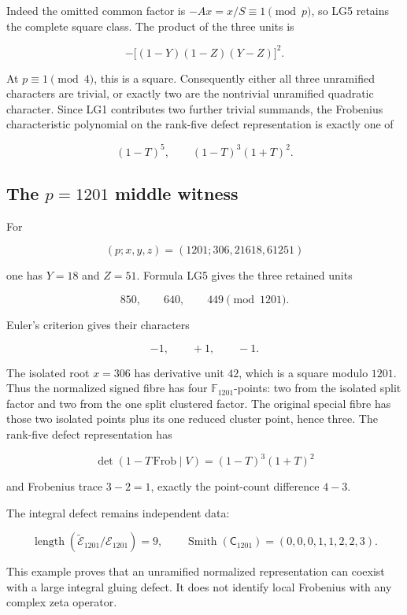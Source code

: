 Indeed the omitted common factor is \(-Ax=x/S\equiv1\pmod p\), so LG5
retains the complete square class. The product of the three units is

\[
-\bigl[(1-Y)(1-Z)(Y-Z)\bigr]^2.
\]

At \(p\equiv1\pmod4\), this is a square. Consequently either all three
unramified characters are trivial, or exactly two are the nontrivial
unramified quadratic character. Since LG1 contributes two further
trivial summands, the Frobenius characteristic polynomial on the
rank-five defect representation is exactly one of

\[
\boxed{(1-T)^5,\qquad (1-T)^3(1+T)^2.}
\tag{LG6}
\]

\subsection{\texorpdfstring{The \(p=1201\) middle
witness}{The p=1201 middle witness}}\label{the-p1201-middle-witness}

For

\[
(p;x,y,z)=(1201;306,21618,61251)
\]

one has \(Y=18\) and \(Z=51\). Formula LG5 gives the three retained
units

\[
850,\qquad640,\qquad449\pmod{1201}.
\]

Euler's criterion gives their characters

\[
-1,\qquad+1,\qquad-1.
\]

The isolated root \(x=306\) has derivative unit \(42\), which is a
square modulo \(1201\). Thus the normalized signed fibre has four
\(\mathbb F_{1201}\)-points: two from the isolated split factor and two
from the one split clustered factor. The original special fibre has
those two isolated points plus its one reduced cluster point, hence
three. The rank-five defect representation has

\[
\boxed{\det(1-T\,\mathrm{Frob}\mid V)=(1-T)^3(1+T)^2}
\]

and Frobenius trace \(3-2=1\), exactly the point-count difference
\(4-3\).

The integral defect remains independent data:

\[
\operatorname{length}
(\widetilde{\mathscr E}_{1201}/\mathscr E_{1201})=9,\qquad
\operatorname{Smith}(\mathsf C_{1201})
=(0,0,0,1,1,2,2,3).
\]

This example proves that an unramified normalized representation can
coexist with a large integral gluing defect. It does not identify local
Frobenius with any complex zeta operator.
